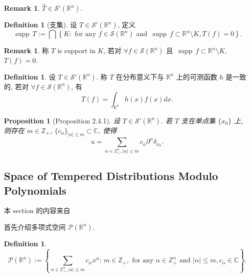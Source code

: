 \documentclass[a4paper,11pt]{article}
\newtheorem{proposition}[theorem]{Proposition}
\theoremstyle{definition}
\newtheorem{remark}[theorem]{Remark}
\newtheorem{definition}[theorem]{Definition}
\def \supp {\mathop\mathrm{\,supp\,}}
\begin{document}
\begin{remark}
     $ \widehat{T} \in \mathcal{S}'(\mathbb{R}^n) $.
\end{remark}

\begin{definition}[支集]
    设 $ T \in \mathcal{S}'(\mathbb{R}^n) $, 定义 
    $$ 
        \supp T := \bigcap \left\{ K: \text{ for any } f \in \mathcal{S}(\mathbb{R}^n) \text{ and } \supp f \subset \mathbb{R}^n \setminus K, 
            T(f) = 0 \right\}.
    $$
\end{definition}

\begin{remark}
     称 $ T $ is support in $ K $, 
     若对 $ \forall f \in \mathcal{S}(\mathbb{R}^n) $ 且 $ \supp f \subset \mathbb{R}^n \setminus K $, $ T(f) = 0 $.
\end{remark}

\begin{definition}
    设 $ T \in \mathcal{S}'(\mathbb{R}^n) $. 称 $ T $ 在分布意义下与 $ \mathbb{R}^n $ 上的可测函数 $ h $ 是一致的, 
    若对 $ \forall f \in \mathcal{S}(\mathbb{R}^n) $, 有
    $$
        T(f) = \int_{\mathbb{R}^n} h(x) f(x) dx.
    $$
\end{definition}

\begin{proposition}[Proposition 2.4.1]
    设 $ T \in \mathcal{S}'(\mathbb{R}^n) $. 若 $ T $ 支在单点集 $ \{x_0\} $ 上, 则存在
    $ m \in \mathbb{Z}_+ $, $ \{c_\alpha\}_{|\alpha| \leq m} \subset \mathbb{C} $, 使得
    $$
        u = \sum_{\alpha \in \mathbb{Z}_+^n, |\alpha| \leq m} c_\alpha \partial^\alpha \delta_{x_0}.
    $$
\end{proposition}

\subsection{Space of Tempered Distributions Modulo Polynomials}

本 section 的内容来自 \cite[1.1.1]{g14}

首先介绍多项式空间 $ \mathcal{P}(\mathbb{R}^n) $.
\begin{definition}
    $$
        \mathcal{P}(\mathbb{R}^n) 
            := \left\{ \sum_{\alpha \in \mathbb{Z}_+^n, |\alpha| \leq m} c_\alpha x^{\alpha} :\,
                 m \in \mathbb{Z}_+, \text{ for any } \alpha \in \mathbb{Z}_+^n \text{ and } |\alpha| \leq m, c_\alpha \in \mathbb{C} \right\}.
    $$
\end{definition} 
\end{document}
